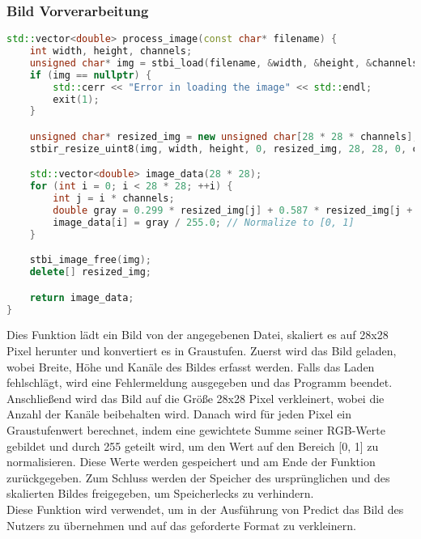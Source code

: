 \subsubsection{Bild Vorverarbeitung}
\label{sec:RealBildVorverarbeitungCode}
\begin{lstlisting}[language=C++]
std::vector<double> process_image(const char* filename) {
    int width, height, channels;
    unsigned char* img = stbi_load(filename, &width, &height, &channels, 0);
    if (img == nullptr) {
        std::cerr << "Error in loading the image" << std::endl;
        exit(1);
    }

    unsigned char* resized_img = new unsigned char[28 * 28 * channels];
    stbir_resize_uint8(img, width, height, 0, resized_img, 28, 28, 0, channels);

    std::vector<double> image_data(28 * 28);
    for (int i = 0; i < 28 * 28; ++i) {
        int j = i * channels;
        double gray = 0.299 * resized_img[j] + 0.587 * resized_img[j + 1] + 0.114 * resized_img[j + 2];
        image_data[i] = gray / 255.0; // Normalize to [0, 1]
    }

    stbi_image_free(img);
    delete[] resized_img;

    return image_data;
}
\end{lstlisting}
Dies Funktion lädt ein Bild von der angegebenen Datei, skaliert es auf 28x28 Pixel herunter und konvertiert es in Graustufen. Zuerst wird das Bild geladen, wobei Breite, Höhe und Kanäle des Bildes erfasst werden. Falls das Laden fehlschlägt, wird eine Fehlermeldung ausgegeben und das Programm beendet. Anschließend wird das Bild auf die Größe 28x28 Pixel verkleinert, wobei die Anzahl der Kanäle beibehalten wird. Danach wird für jeden Pixel ein Graustufenwert berechnet, indem eine gewichtete Summe seiner RGB-Werte gebildet und durch 255 geteilt wird, um den Wert auf den Bereich [0, 1] zu normalisieren. Diese Werte werden gespeichert und am Ende der Funktion zurückgegeben. Zum Schluss werden der Speicher des ursprünglichen und des skalierten Bildes freigegeben, um Speicherlecks zu verhindern.
\\
Diese Funktion wird verwendet, um in der Ausführung von Predict das Bild des Nutzers zu übernehmen und auf das geforderte Format zu verkleinern.